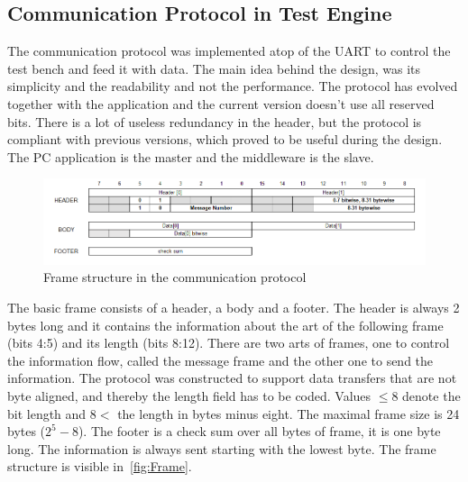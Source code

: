 \subsection{Communication Protocol in Test Engine}
The communication protocol was implemented atop of the UART to control the test bench and feed it with data. The main idea behind the design, was its simplicity and the readability and not the performance. The protocol has evolved together with the application and the current version doesn't use all reserved bits. There is a lot of useless redundancy in the header, but the protocol is compliant with previous versions, which proved to be useful during the design. The PC application is the master and the middleware is the slave.

\begin{figure}[H]
\centering
\includegraphics[width=\textwidth]{figures/SerialFrame.png}
\caption{Frame structure in the communication protocol}
\label{fig:Frame}
\end{figure}

The basic frame consists of a header, a body and a footer. The header is always 2 bytes long and it contains the information about the art of the following frame (bits 4:5) and its length (bits 8:12). There are two arts of frames, one to control the information flow, called the message frame and the other one to send the information. The protocol was constructed to support data transfers that are not byte aligned, and thereby the length field has to be coded. Values $\leq 8$ denote the bit length and $8 <$ the length in bytes minus eight. The maximal frame size is 24 bytes ($2^5 - 8$). The footer is a check sum over all bytes of frame, it is one byte long. The information is always sent starting with the lowest byte. The frame structure is visible in~\autoref{fig:Frame}.


